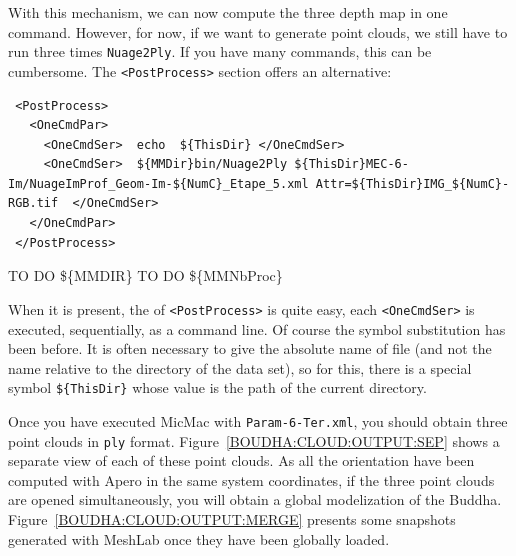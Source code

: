 With this mechanism, we can now compute the three depth map in one command.
However, for now, if we want to generate point clouds, we still have to run three
times {\tt Nuage2Ply}. If you have many commands, this can be cumbersome. The
{\tt <PostProcess>} section offers an alternative:


{\scriptsize
\begin{verbatim}
 <PostProcess>
   <OneCmdPar>
     <OneCmdSer>  echo  ${ThisDir} </OneCmdSer>
     <OneCmdSer>  ${MMDir}bin/Nuage2Ply ${ThisDir}MEC-6-Im/NuageImProf_Geom-Im-${NumC}_Etape_5.xml Attr=${ThisDir}IMG_${NumC}-RGB.tif  </OneCmdSer>
   </OneCmdPar>
 </PostProcess>

\end{verbatim}
}

TO DO \$\{MMDIR\}
TO DO \$\{MMNbProc\}

When it is present, the  of {\tt <PostProcess>} is quite easy, each {\tt <OneCmdSer>} is
executed, sequentially, as a command line. Of course the symbol substitution has been 
before. It is often necessary to give the absolute name of file (and not the name relative to
the directory of the data set), so for this, there is a special symbol {\tt \$\{ThisDir\}} whose
value is the path of the current directory.

Once you have executed MicMac with {\tt Param-6-Ter.xml}, you should obtain
three point clouds in {\tt ply} format.
Figure~\ref{BOUDHA:CLOUD:OUTPUT:SEP} shows a separate view of
each of these point clouds.
As all the orientation have been computed with Apero in the same system
coordinates, if the three point clouds are opened simultaneously, you will obtain
a global modelization of the Buddha.  Figure~\ref{BOUDHA:CLOUD:OUTPUT:MERGE}
presents some snapshots generated with MeshLab once they have been globally loaded.

